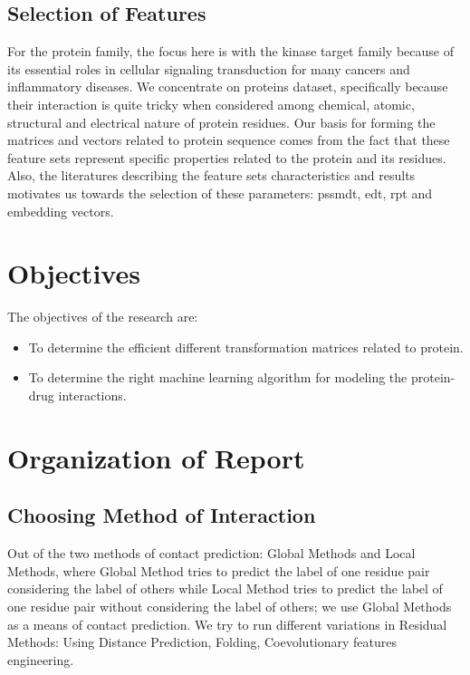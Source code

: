 \subsection{Selection of Features}

For the protein family, the focus here is with the kinase target family because of its essential roles in cellular signaling transduction for many cancers and inflammatory diseases. We concentrate on proteins dataset, specifically because their interaction is quite tricky when considered among chemical, atomic, structural and electrical nature of protein residues. Our basis for forming the matrices and vectors related to protein sequence comes from the fact that these feature sets represent specific properties related to the protein and its residues. Also, the literatures describing the feature sets characteristics and results motivates us towards the selection of these parameters: \acrshort{pssmdt}, \acrshort{edt}, \acrshort{rpt} and embedding vectors.


\section{Objectives}
The objectives of the research are:
\begin{itemize}
    \setlength\parindent{36pt}
    \item To determine the efficient different transformation matrices related to protein.
    \item To determine the right machine learning algorithm for modeling the protein-drug interactions.
\end{itemize}




\section{Organization of Report}

\subsection{Choosing Method of Interaction}
Out of the two methods of contact prediction: Global Methods and Local Methods, where Global Method tries to predict the label of one residue pair considering the label of others while Local Method tries to predict the label of one residue pair without considering the label of others; we use Global Methods as a means of contact prediction. We try to run different variations in Residual Methods: Using Distance Prediction, Folding, Coevolutionary features engineering. 

